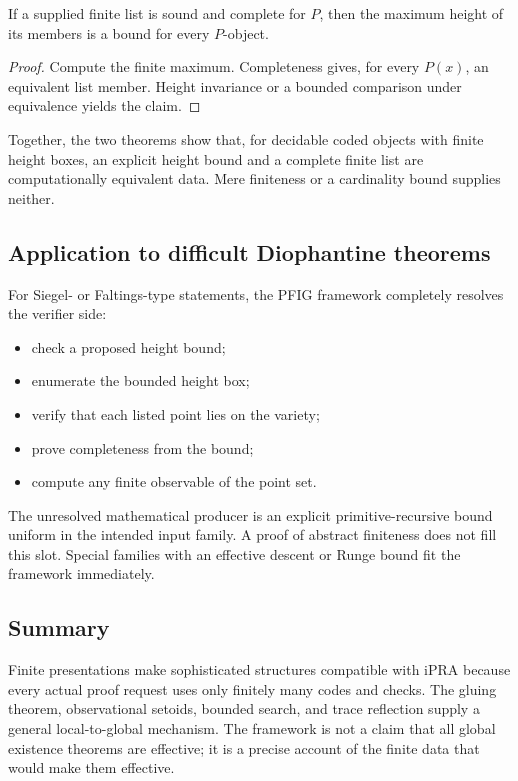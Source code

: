 \begin{theorem}
\label{thm:list-to-height}
If a supplied finite list is sound and complete for \(P\), then the maximum height of its members is a bound for every \(P\)-object.
\end{theorem}

\begin{proof}
Compute the finite maximum.  Completeness gives, for every \(P(x)\), an equivalent list member.  Height invariance or a bounded comparison under equivalence yields the claim.
\end{proof}

Together, the two theorems show that, for decidable coded objects with finite height boxes, an explicit height bound and a complete finite list are computationally equivalent data.  Mere finiteness or a cardinality bound supplies neither.

\subsection{Application to difficult Diophantine theorems}

For Siegel- or Faltings-type statements, the PFIG framework completely resolves the verifier side:

\begin{itemize}
\item check a proposed height bound;
\item enumerate the bounded height box;
\item verify that each listed point lies on the variety;
\item prove completeness from the bound;
\item compute any finite observable of the point set.
\end{itemize}

The unresolved mathematical producer is an explicit primitive-recursive bound uniform in the intended input family.  A proof of abstract finiteness does not fill this slot.  Special families with an effective descent or Runge bound fit the framework immediately.

\subsection{Summary}

Finite presentations make sophisticated structures compatible with iPRA because every actual proof request uses only finitely many codes and checks.  The gluing theorem, observational setoids, bounded search, and trace reflection supply a general local-to-global mechanism.  The framework is not a claim that all global existence theorems are effective; it is a precise account of the finite data that would make them effective.
